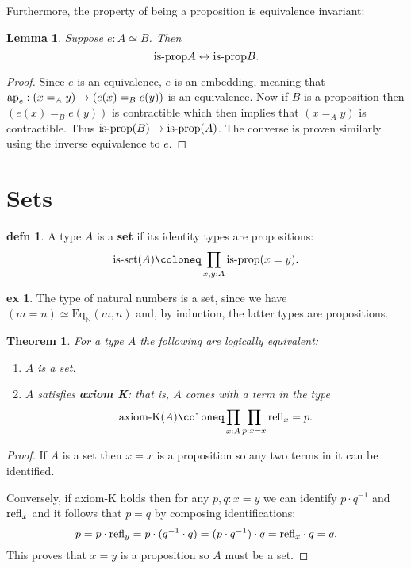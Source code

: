 \documentclass{amsart}
\theoremstyle{theorem}
\newtheorem*{thm}{Theorem}
\newtheorem*{lem}{Lemma}
\theoremstyle{definition}
\newtheorem*{defn}{defn}
\newtheorem*{ex}{ex}
\theoremstyle{remark}
\newcommand{\0}{\mathbbe{0}}
\newcommand{\1}{\mathbbe{1}}
\newcommand{\2}{\mathbbe{2}}
\newcommand{\3}{\mathbbe{3}}
\newcommand{\4}{\mathbbe{4}}
\newcommand{\term}[1]{{\textup{#1}}}
\newcommand{\type}[1]{{\textup{#1}}}
\newcommand{\bN}{{\mathbb{N}}}
\newcommand{\refl}{\term{refl}}
\newcommand{\ap}{\term{ap}}
\newcommand{\Eq}{\mathrm{Eq}}
\newcommand{\is}[1]{\type{is-{#1}}}
\newcommand{\isprop}{\type{is-prop}}
\renewcommand{\iff}{\leftrightarrow}
\begin{document}
Furthermore, the property of being a proposition is equivalence invariant:

\begin{lem} Suppose $e : A\simeq B$. Then
\[ \isprop{A} \iff \isprop{B}.\]
\end{lem}

\begin{proof}
Since $e$ is an equivalence, $e$ is an embedding, meaning that $\ap_e : (x=_Ay) \to (e(x)=_B e(y))$ is an equivalence. Now if $B$ is a proposition then $(e(x)=_Be(y))$ is contractible which then implies that $(x=_Ay)$ is contractible. Thus $\isprop(B) \to \isprop(A)$. The converse is proven similarly using the inverse equivalence to $e$.
\end{proof}


\section*{Sets}

\begin{defn} A type $A$ is a \textbf{set} if its identity types are propositions:
\[ \is{set}(A) \coloneq \prod_{x,y:A} \isprop(x=y).\]
\end{defn}

\begin{ex} The type of natural numbers is a set, since we have $(m=n) \simeq \Eq_\bN(m,n)$ and, by induction, the latter types are propositions.
\end{ex}

\begin{thm} For a type $A$ the following are logically equivalent:
\begin{enumerate}
\item $A$ is a set.
\item $A$ satisfies \textbf{axiom K}: that is, $A$ comes with a term in the type
\[ \type{axiom-K}(A) \coloneq \prod_{x:A} \prod_{p : x =x} \refl_x = p.\]
\end{enumerate}
\end{thm}
\begin{proof}
If $A$ is a set then $x=x$ is a proposition so any two terms in it can be identified.

Conversely, if axiom-K holds then for any $p,q : x =y$ we can identify $p \cdot q^{-1}$ and $\refl_x$ and it follows that $p=q$ by composing identifications:
\[ p = p \cdot \refl_y = p \cdot (q^{-1} \cdot q) = (p \cdot q^{-1}) \cdot q = \refl_x \cdot q = q.\] This proves that $x=y$ is a proposition so $A$ must be a set.
\end{proof}
\end{document}
